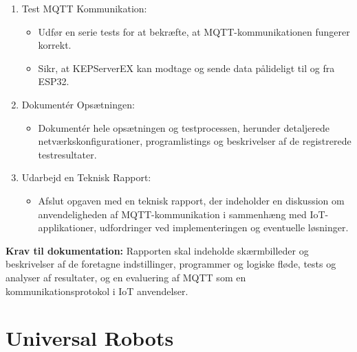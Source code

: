 \begin{enumerate}
\begin{itemize}
	\end{itemize}
	\item Test MQTT Kommunikation:
	\begin{itemize}
		\item Udfør en serie tests for at bekræfte, at MQTT-kommunikationen fungerer korrekt.
		\item Sikr, at KEPServerEX kan modtage og sende data pålideligt til og fra ESP32.
	\end{itemize}
	\item Dokumentér Opsætningen:
	\begin{itemize}
		\item Dokumentér hele opsætningen og testprocessen, herunder detaljerede netværkskonfigurationer, programlistings og beskrivelser af de registrerede testresultater.
	\end{itemize}
	\item Udarbejd en Teknisk Rapport:
	\begin{itemize}
		\item Afslut opgaven med en teknisk rapport, der indeholder en diskussion om anvendeligheden af MQTT-kommunikation i sammenhæng med IoT-applikationer, udfordringer ved implementeringen og eventuelle løsninger.
	\end{itemize}
\end{enumerate}
\textbf{Krav til dokumentation:} Rapporten skal indeholde skærmbilleder og beskrivelser af de foretagne indstillinger, programmer og logiske fløde, tests og analyser af resultater, og en evaluering af MQTT som en kommunikationsprotokol i IoT anvendelser.

\chapter{Universal Robots}
\label{sec:ur_opgaver}

